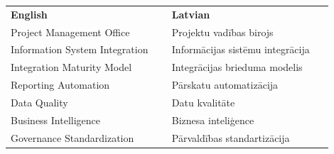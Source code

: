 \frontmatterpage
{}
\begin{tabular}{p{0.45\linewidth}p{0.45\linewidth}}
\textbf{English} & \textbf{Latvian}\\
Project Management Office & Projektu vadības birojs\\
Information System Integration & Informācijas sistēmu integrācija\\
Integration Maturity Model & Integrācijas brieduma modelis\\
Reporting Automation & Pārskatu automatizācija\\
Data Quality & Datu kvalitāte\\
Business Intelligence & Biznesa inteliģence\\
Governance Standardization & Pārvaldības standartizācija\\
\end{tabular}
\clearpage

